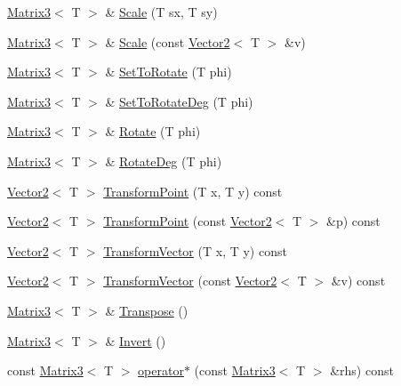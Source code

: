 \begin{DoxyCompactItemize}
\item 
\hyperlink{classastu_1_1Matrix3}{Matrix3}$<$ T $>$ \& \hyperlink{classastu_1_1Matrix3_aaf8d53bb087155b957c360692a08a441}{Scale} (T sx, T sy)
\item 
\hyperlink{classastu_1_1Matrix3}{Matrix3}$<$ T $>$ \& \hyperlink{classastu_1_1Matrix3_ab8f629433a5f3cae4da890b1e22dd4f4}{Scale} (const \hyperlink{classastu_1_1Vector2}{Vector2}$<$ T $>$ \&v)
\item 
\hyperlink{classastu_1_1Matrix3}{Matrix3}$<$ T $>$ \& \hyperlink{classastu_1_1Matrix3_aba79cb7b9d74b6baff4c02ad79d19944}{Set\+To\+Rotate} (T phi)
\item 
\hyperlink{classastu_1_1Matrix3}{Matrix3}$<$ T $>$ \& \hyperlink{classastu_1_1Matrix3_aa4a5c1751182cc20eeefa337d13fbceb}{Set\+To\+Rotate\+Deg} (T phi)
\item 
\hyperlink{classastu_1_1Matrix3}{Matrix3}$<$ T $>$ \& \hyperlink{classastu_1_1Matrix3_a8169f310b4eabb938e0cf388569cd88d}{Rotate} (T phi)
\item 
\hyperlink{classastu_1_1Matrix3}{Matrix3}$<$ T $>$ \& \hyperlink{classastu_1_1Matrix3_aa621d700116ea799d236edf376586fb0}{Rotate\+Deg} (T phi)
\item 
\hyperlink{classastu_1_1Vector2}{Vector2}$<$ T $>$ \hyperlink{classastu_1_1Matrix3_a5a241d1002dbf9cb9505f314d9ed92ff}{Transform\+Point} (T x, T y) const
\item 
\hyperlink{classastu_1_1Vector2}{Vector2}$<$ T $>$ \hyperlink{classastu_1_1Matrix3_a3e2c8ac9bae632e01f29dfc06fdf32dd}{Transform\+Point} (const \hyperlink{classastu_1_1Vector2}{Vector2}$<$ T $>$ \&p) const
\item 
\hyperlink{classastu_1_1Vector2}{Vector2}$<$ T $>$ \hyperlink{classastu_1_1Matrix3_a8b3caf37d3ce5df9b7d7f42b5ec02cd4}{Transform\+Vector} (T x, T y) const
\item 
\hyperlink{classastu_1_1Vector2}{Vector2}$<$ T $>$ \hyperlink{classastu_1_1Matrix3_a5f64a156008433283fc2de9ee54604da}{Transform\+Vector} (const \hyperlink{classastu_1_1Vector2}{Vector2}$<$ T $>$ \&v) const
\item 
\hyperlink{classastu_1_1Matrix3}{Matrix3}$<$ T $>$ \& \hyperlink{classastu_1_1Matrix3_a8cfa018da9fa68ea48c42e1100110a07}{Transpose} ()
\item 
\hyperlink{classastu_1_1Matrix3}{Matrix3}$<$ T $>$ \& \hyperlink{classastu_1_1Matrix3_a759cae68ce89b24da8fe1d79bae88e37}{Invert} ()
\item 
const \hyperlink{classastu_1_1Matrix3}{Matrix3}$<$ T $>$ \hyperlink{classastu_1_1Matrix3_a2fef9723742fe842623d1a0309db45ab}{operator$\ast$} (const \hyperlink{classastu_1_1Matrix3}{Matrix3}$<$ T $>$ \&rhs) const

\end{DoxyCompactItemize}
